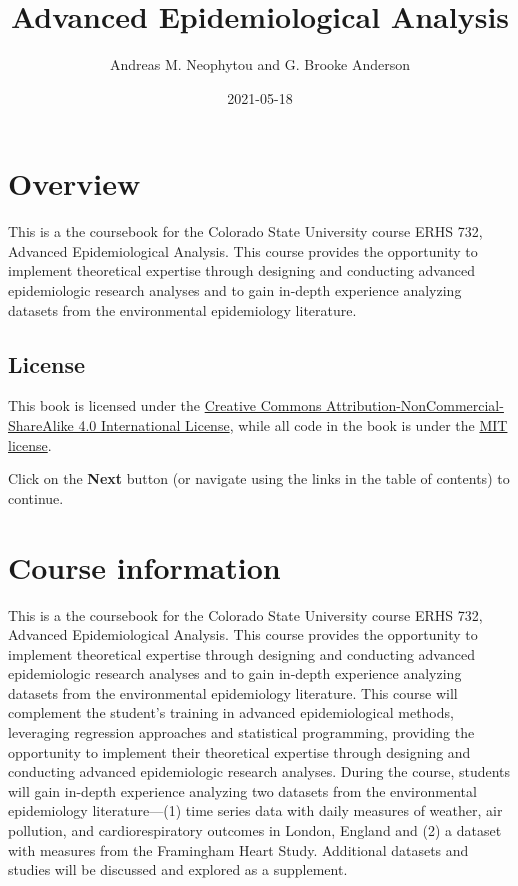 \documentclass[
]{book}
\title{Advanced Epidemiological Analysis}
\author{Andreas M. Neophytou and G. Brooke Anderson}
\date{2021-05-18}
\begin{document}
\maketitle

{
\setcounter{tocdepth}{1}
\tableofcontents
}
\hypertarget{overview}{%
\chapter{Overview}\label{overview}}

This is a the coursebook for the Colorado State University course ERHS 732,
Advanced Epidemiological Analysis. This course provides the opportunity to
implement theoretical expertise through designing and conducting advanced
epidemiologic research analyses and to gain in-depth experience analyzing
datasets from the environmental epidemiology literature.

\hypertarget{license}{%
\section{License}\label{license}}

This book is licensed under the \href{https://creativecommons.org/licenses/by-nc-sa/4.0/}{Creative Commons
Attribution-NonCommercial-ShareAlike 4.0 International
License}, while all code in
the book is under the \href{https://opensource.org/licenses/MIT}{MIT license}.

Click on the \textbf{Next} button (or navigate using the links in the table of
contents) to continue.

\hypertarget{courseinfo}{%
\chapter{Course information}\label{courseinfo}}

This is a the coursebook for the Colorado State University course ERHS 732,
Advanced Epidemiological Analysis. This course provides the opportunity to
implement theoretical expertise through designing and conducting advanced
epidemiologic research analyses and to gain in-depth experience analyzing
datasets from the environmental epidemiology literature. This course will
complement the student's training in advanced epidemiological methods,
leveraging regression approaches and statistical programming, providing the
opportunity to implement their theoretical expertise through designing and
conducting advanced epidemiologic research analyses. During the course,
students will gain in-depth experience analyzing two datasets from the
environmental epidemiology literature---(1) time series data with daily measures
of weather, air pollution, and cardiorespiratory outcomes in London, England and
(2) a dataset with measures from the Framingham Heart Study. Additional datasets
and studies will be discussed and explored as a supplement.
\end{document}
